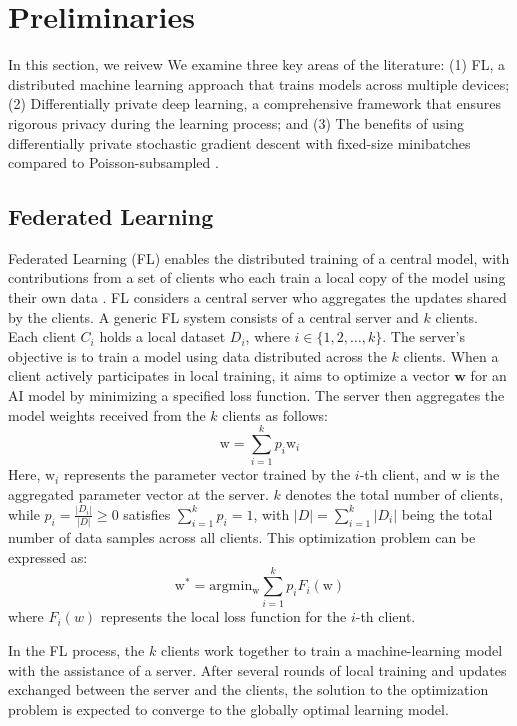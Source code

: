  \section{Preliminaries}
In this section, we reivew
We examine three key areas of the literature: (1) FL, a distributed machine learning approach that trains models across multiple devices; (2) Differentially private deep learning, a comprehensive framework that ensures rigorous privacy during the learning process; and (3) The benefits of using differentially private stochastic gradient descent with fixed-size minibatches compared to Poisson-subsampled \rdp. 
\subsection{Federated Learning}

Federated Learning (FL) enables the distributed training of a central model, with contributions from a set of clients who each train a local copy of the model using their own data \cite{mcmahan2017communication}. 
FL considers a central server who aggregates the updates shared by the clients. 
 A generic FL system consists of  a central server and \( k \) clients. Each client \( C_i \) holds a local dataset \( D_i \), where \( i \in \{1, 2, \dots, k\} \). The server's objective is to train a model using data distributed across the \( k \) clients. When a client actively participates in local training, it aims to optimize a vector $\mathbf{w}$ for an AI model by minimizing a specified loss function. The server then aggregates the model weights received from the \( k \) clients as follows:\[ \mathrm{w}=\sum_{i=1}^{k} p_i\mathrm{w}_i \]
Here, \( \mathrm{w}_i \) represents the parameter vector trained by the \( i \)-th client, and  w is the aggregated parameter vector at the server. \( k \) denotes the total number of clients, while \( p_i = \frac{|D_i|}{|D|} \geq 0 \) satisfies \( \sum_{i=1}^{k} p_i = 1 \), with \( |D| = \sum_{i=1}^{k} |D_i| \) being the total number of data samples across all clients. This optimization problem can be expressed as:
\[ \mathrm{w^*}=\mathrm{argmin_w}\sum_{i=1}^{k}p_iF_i(\mathrm{w}) \] 
where \( F_i(w) \) represents the local loss function for the \( i \)-th client.

In the FL process, the \( k \) clients work together to train a machine-learning model with the assistance of a server. After several rounds of local training and updates exchanged between the server and the clients, the solution to the optimization problem is expected to converge to the globally optimal learning model.
